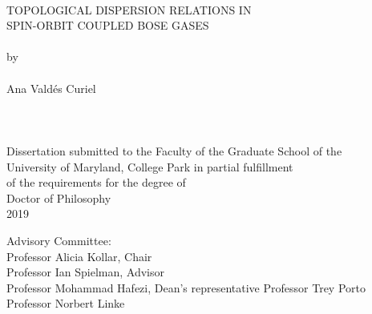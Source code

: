 
\thispagestyle{empty}
\hbox{\ }
\vspace{1in}
\renewcommand{\baselinestretch}{1}
\small\normalsize
\begin{center}

\large{{TOPOLOGICAL DISPERSION RELATIONS IN}} \\
\large{{SPIN-ORBIT COUPLED BOSE GASES}}
\ \\
\ \\
\large{by} \\
\ \\
\large{Ana Vald\'es Curiel}%
\ \\
\ \\
\ \\
\ \\
\normalsize
Dissertation submitted to the Faculty of the Graduate School of the \\
University of Maryland, College Park in partial fulfillment \\
of the requirements for the degree of \\
Doctor of Philosophy \\
2019
\end{center}

\vspace{7.5em}

\noindent Advisory Committee: \\
Professor Alicia Kollar, Chair \\
Professor Ian Spielman, Advisor \\
Professor Mohammad Hafezi, Dean's representative
Professor Trey Porto \\
Professor Norbert Linke 


